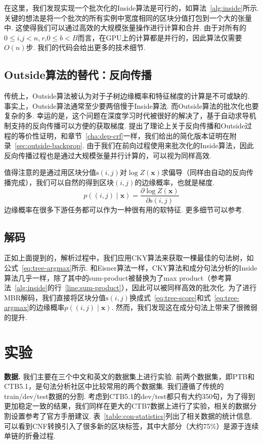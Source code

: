 在这里，我们发现实现一个批次化的Inside算法是可行的，如算法~\ref{alg:inside}所示.
关键的想法是将一个批次的所有实例中宽度相同的区块分值打包到一个大的张量中.
这使得我们可以通过高效的大规模张量操作进行计算和合并.
由于对所有的$0 \le i$,$j<n$,$~r$,$0\le b<B$而言，在GPU上的计算都是并行的，因此算法仅需要$O(n)$步.
我们的代码会给出更多的技术细节.

\subsection{Outside算法的替代：反向传播}

传统上，Outside算法被认为对于子树边缘概率和特征梯度的计算是不可或缺的.
事实上，Outside算法通常至少要两倍慢于Inside算法.
而Outside算法的批次化也要复杂的多.
幸运的是，这个问题在深度学习时代被很好的解决了，基于自动求导机制支持的反向传播可以方便的获取梯度.
\cite{eisner-2016-inside}提出了理论上关于反向传播和Outside过程的等价性证明，和章节~\ref{cha:dep-crf}一样，我们给出的简化版本证明在附录~\ref{sec:outside-backprop}.
由于我们在前向过程使用来批次化的Inside算法，因此反向传播过程也是通过大规模张量并行计算的，可以视为同样高效.

值得注意的是通过用区块分值$\mathrm{s}(i,j)$对$\log Z(\boldsymbol{x})$求偏导（同样由自动的反向传播完成），我们可以自然的得到区块$(i,j)$的边缘概率，也就是梯度.
\begin{equation} \label{eq:partial-derivative}
    p((i, j)\mid\boldsymbol{x}) = \frac{\partial \log Z(\boldsymbol{x})}{\partial \mathrm{s}(i, j)}
\end{equation}
边缘概率在很多下游任务都可以作为一种很有用的软特征.
更多细节可以参考\cite{eisner-2016-inside}.

\subsection{解码}

正如上面提到的，解析过程中，我们应用CKY算法来获取一棵最佳的句法树，如公式~\ref{eq:tree-argmax}所示.
和Eisner算法一样，CKY算法和成分句法分析的Inside算法几乎一样，除了其中的sum-product被替换为了max product（参考算法~\ref{alg:inside}的行~\ref{line:sum-product}），因此可以被同样高效的批次化.
为了进行MBR解码，我们直接将区块分值$\mathrm{s}(i,j)$换成式~\ref{eq:tree-score}和式~\ref{eq:tree-argmax}的边缘概率$p((i,j)\mid\boldsymbol{x})$.
然而，我们发现这在成分句法上带来了很微弱的提升.



\section{实验}
\label{sec:con-experiments}
\noindent\textbf{数据.}
我们主要在三个中文和英文的数据集上进行实验.
前两个数据集，即PTB和CTB5.1，是句法分析社区中比较常用的两个数据集.
我们遵循了传统的train/dev/test数据的分割.
考虑到CTB5.1的dev/test都只有大约350句，为了得到更加稳定一致的结果，我们同样在更大的CTB7数据上进行了实验，相关的数据分割设置参考了官方手册建议.
表~\ref{table:con-statistics}列出了相关数据的统计信息.
可以看到CNF转换引入了很多新的区块标签，其中大部分（大约75\%）是源于连续单链的折叠过程.

